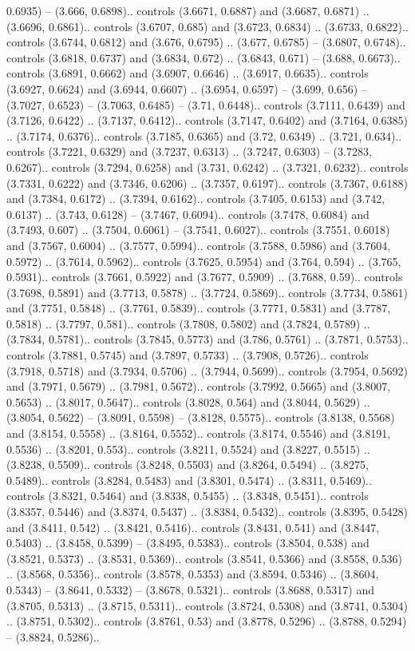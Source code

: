 0.6935) -- (3.666, 0.6898).. controls (3.6671, 0.6887) and (3.6687, 0.6871) .. (3.6696, 0.6861).. controls (3.6707, 0.685) and (3.6723, 0.6834) .. (3.6733, 0.6822).. controls (3.6744, 0.6812) and (3.676, 0.6795) .. (3.677, 0.6785) -- (3.6807, 0.6748).. controls (3.6818, 0.6737) and (3.6834, 0.672) .. (3.6843, 0.671) -- (3.688, 0.6673).. controls (3.6891, 0.6662) and (3.6907, 0.6646) .. (3.6917, 0.6635).. controls (3.6927, 0.6624) and (3.6944, 0.6607) .. (3.6954, 0.6597) -- (3.699, 0.656) -- (3.7027, 0.6523) -- (3.7063, 0.6485) -- (3.71, 0.6448).. controls (3.7111, 0.6439) and (3.7126, 0.6422) .. (3.7137, 0.6412).. controls (3.7147, 0.6402) and (3.7164, 0.6385) .. (3.7174, 0.6376).. controls (3.7185, 0.6365) and (3.72, 0.6349) .. (3.721, 0.634).. controls (3.7221, 0.6329) and (3.7237, 0.6313) .. (3.7247, 0.6303) -- (3.7283, 0.6267).. controls (3.7294, 0.6258) and (3.731, 0.6242) .. (3.7321, 0.6232).. controls (3.7331, 0.6222) and (3.7346, 0.6206) .. (3.7357, 0.6197).. controls (3.7367, 0.6188) and (3.7384, 0.6172) .. (3.7394, 0.6162).. controls (3.7405, 0.6153) and (3.742, 0.6137) .. (3.743, 0.6128) -- (3.7467, 0.6094).. controls (3.7478, 0.6084) and (3.7493, 0.607) .. (3.7504, 0.6061) -- (3.7541, 0.6027).. controls (3.7551, 0.6018) and (3.7567, 0.6004) .. (3.7577, 0.5994).. controls (3.7588, 0.5986) and (3.7604, 0.5972) .. (3.7614, 0.5962).. controls (3.7625, 0.5954) and (3.764, 0.594) .. (3.765, 0.5931).. controls (3.7661, 0.5922) and (3.7677, 0.5909) .. (3.7688, 0.59).. controls (3.7698, 0.5891) and (3.7713, 0.5878) .. (3.7724, 0.5869).. controls (3.7734, 0.5861) and (3.7751, 0.5848) .. (3.7761, 0.5839).. controls (3.7771, 0.5831) and (3.7787, 0.5818) .. (3.7797, 0.581).. controls (3.7808, 0.5802) and (3.7824, 0.5789) .. (3.7834, 0.5781).. controls (3.7845, 0.5773) and (3.786, 0.5761) .. (3.7871, 0.5753).. controls (3.7881, 0.5745) and (3.7897, 0.5733) .. (3.7908, 0.5726).. controls (3.7918, 0.5718) and (3.7934, 0.5706) .. (3.7944, 0.5699).. controls (3.7954, 0.5692) and (3.7971, 0.5679) .. (3.7981, 0.5672).. controls (3.7992, 0.5665) and (3.8007, 0.5653) .. (3.8017, 0.5647).. controls (3.8028, 0.564) and (3.8044, 0.5629) .. (3.8054, 0.5622) -- (3.8091, 0.5598) -- (3.8128, 0.5575).. controls (3.8138, 0.5568) and (3.8154, 0.5558) .. (3.8164, 0.5552).. controls (3.8174, 0.5546) and (3.8191, 0.5536) .. (3.8201, 0.553).. controls (3.8211, 0.5524) and (3.8227, 0.5515) .. (3.8238, 0.5509).. controls (3.8248, 0.5503) and (3.8264, 0.5494) .. (3.8275, 0.5489).. controls (3.8284, 0.5483) and (3.8301, 0.5474) .. (3.8311, 0.5469).. controls (3.8321, 0.5464) and (3.8338, 0.5455) .. (3.8348, 0.5451).. controls (3.8357, 0.5446) and (3.8374, 0.5437) .. (3.8384, 0.5432).. controls (3.8395, 0.5428) and (3.8411, 0.542) .. (3.8421, 0.5416).. controls (3.8431, 0.541) and (3.8447, 0.5403) .. (3.8458, 0.5399) -- (3.8495, 0.5383).. controls (3.8504, 0.538) and (3.8521, 0.5373) .. (3.8531, 0.5369).. controls (3.8541, 0.5366) and (3.8558, 0.536) .. (3.8568, 0.5356).. controls (3.8578, 0.5353) and (3.8594, 0.5346) .. (3.8604, 0.5343) -- (3.8641, 0.5332) -- (3.8678, 0.5321).. controls (3.8688, 0.5317) and (3.8705, 0.5313) .. (3.8715, 0.5311).. controls (3.8724, 0.5308) and (3.8741, 0.5304) .. (3.8751, 0.5302).. controls (3.8761, 0.53) and (3.8778, 0.5296) .. (3.8788, 0.5294) -- (3.8824, 0.5286).. 
